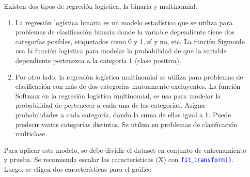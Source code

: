 \documentclass[a4paper, 12pt]{book}
\begin{document}
Existen dos tipos de regresión logística, la binaria y multinomial:
\begin{enumerate}
	\item La regresión logística binaria es un modelo estadístico que se utiliza para problemas de clasificación binaria donde la variable dependiente tiene dos categorías posibles, etiquetados como 0 y 1, sí y no, etc. La función Sigmoide usa la función logística para modelar la probabilidad de que la variable dependiente pertenezca a la categoría 1 (clase positiva).
	\item Por otro lado, la regresión logística multinomial se utiliza para problemas de clasificación con más de dos categorías mutuamente excluyentes. La función Softmax en la regresión logística multinomial, se usa para modelar la probabilidad de pertenecer a cada una de las categorías. Asigna probabilidades a cada categoría, dando la suma de ellas igual a 1. Puede predecir varias categorías distintas. Se utiliza en problemas de clasificación multiclase.
\end{enumerate}

Para aplicar este modelo, se debe dividir el dataset en conjunto de entrenamiento y prueba. Se recomienda escalar las características (X) con \texttt{\textcolor{blue}{fit$\_$transform()}}. Luego, se eligen dos características para el gráfico
\end{document}
